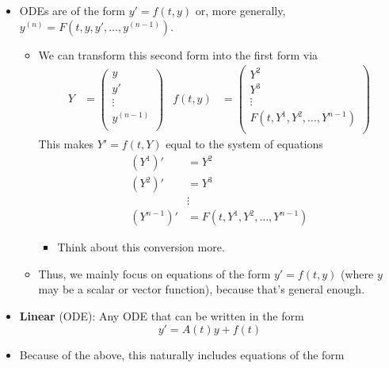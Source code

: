 \documentclass[../notes.tex]{subfiles}
\begin{document}
\begin{itemize}
    \item ODEs are of the form $y'=f(t,y)$ or, more generally, $y^{(n)}=F(t,y,y',\dots,y^{(n-1)})$.
    \begin{itemize}
        \item We can transform this second form into the first form via
        \begin{align*}
            Y &=
            \begin{pmatrix}
                y\\
                y'\\
                \vdots\\
                y^{(n-1)}\\
            \end{pmatrix}&
            f(t,y) &=
            \begin{pmatrix}
                Y^2\\
                Y^3\\
                \vdots\\
                F(t,Y^1,Y^2,\dots,Y^{n-1})\\
            \end{pmatrix}
        \end{align*}
        This makes $Y'=f(t,Y)$ equal to the system of equations
        \begin{align*}
            (Y^1)' &= Y^2\\
            (Y^2)' &= Y^3\\
            &\vdots\\
            (Y^{n-1})' &= F(t,Y^1,Y^2,\dots,Y^{n-1})
        \end{align*}
        \begin{itemize}
            \item Think about this conversion more.
        \end{itemize}
        \item Thus, we mainly focus on equations of the form $y'=f(t,y)$ (where $y$ may be a scalar or vector function), because that's general enough.
    \end{itemize}
    \item \textbf{Linear} (ODE): Any ODE that can be written in the form
    \begin{equation*}
        y' = A(t)y+f(t)
    \end{equation*}
    \item Because of the above, this naturally includes equations of the form
    \begin{equation*}

\end{equation*}
\end{itemize}
\end{document}
